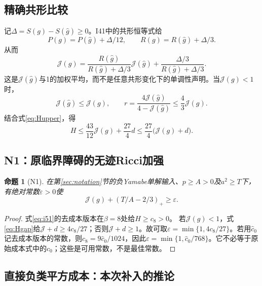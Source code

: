 \documentclass[UTF8,fontset=fandol,zihao=-4,a4paper]{ctexart}
\newtheorem{proposition}{命题}[section]
\theoremstyle{remark}
\newcommand{\J}{\mathcal J}
\begin{document}
\subsection{精确共形比较}

记$\Delta=S(g)-S(\widehat g)\ge0$。I41中的共形恒等式给
\begin{equation}
P(g)=P(\widehat g)+\Delta/12,
\qquad R(g)=R(\widehat g)+\Delta/3.
\label{eq:conf}
\end{equation}
从而
\begin{equation}
\J(g)=\frac{R(\widehat g)}{R(\widehat g)+\Delta/3}\J(\widehat g)
+\frac{\Delta/3}{R(\widehat g)+\Delta/3}.
\label{eq:weightedJ}
\end{equation}
这是$\J(\widehat g)$与1的加权平均，而不是任意共形变化下的单调性声明。当$\J(g)<1$时，
\begin{equation}
\J(\widehat g)\le\J(g),\qquad
r=\frac{4\J(\widehat g)}{4-\J(\widehat g)}
\le\frac43\J(g).
\label{eq:rJ}
\end{equation}
结合式\eqref{eq:Hupper}，得
\begin{equation}
H\le\frac{43}{12}\J(g)+\frac{27}{4}d
\le\frac{27}{4}\bigl(\J(g)+d\bigr).
\label{eq:Hgap}
\end{equation}

\subsection{N1：原临界障碍的无迹Ricci加强}

\begin{proposition}[N1]
在第\ref{sec:notation}节的负Yamabe单解输入、$p\ge A>0$及$a^2\ge T$下，有绝对常数$\varepsilon>0$使
\begin{equation}
\boxed{\J(g)+(T/A-2/3)_+\ge\varepsilon.}
\label{eq:N1}
\end{equation}
\end{proposition}
\begin{proof}
式\eqref{eq:i51}的去成本版本在$\beta=8$处给$H\ge c_8>0$。
若$\J(g)<1$，式\eqref{eq:Hgap}给$\J+d\ge4c_8/27$；否则$\J+d\ge1$。故可取$\varepsilon=\min\{1,4c_8/27\}$。若用$\widehat c_0$记去成本版本的常数，则$c_8=9\widehat c_0/1024$，因此$\varepsilon=\min\{1,\widehat c_0/768\}$。它不必等于原始成本式中的$c_0$；这些是可用常数，不是最佳常数。
\end{proof}

\subsection{直接负类平方成本：本次补入的推论}
\end{document}
